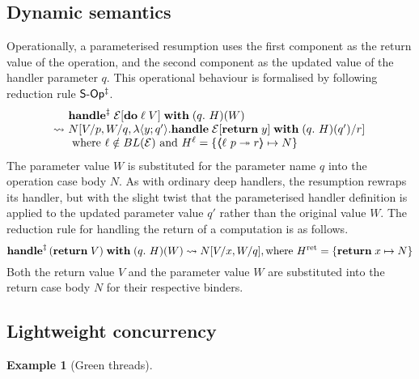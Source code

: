 \documentclass[12pt,phd,lfcs,twoside,openright,logo,leftchapter,normalheadings]{infthesis}
\theoremstyle{plain}
\theoremstyle{definition}
\newtheorem{example}{Example}[chapter]
\begin{document}
\subsection{Dynamic semantics}
Operationally, a parameterised resumption uses the first component as
the return value of the operation, and the second component as the
updated value of the handler parameter $q$.
%
This operational behaviour is formalised by following reduction rule
$\mathsf{S\textrm{-}Op^{\ddagger}}$.
%
\[
\ba{@{~}l@{~}l}
  &\ParamHandle \; \EC[\Do \; \ell \; V] \; \With \; (q.~H)(W)\\
  \reducesto&
  N[V/p,W/q,\lambda \Record{y;q'}.\Handle \; \EC[\Return \; y] \; \With \; (q.~H)(q')/r]\\
  & \text{ where } \ell \notin BL(\EC) \text{ and } \hell = \{ \OpCase{\ell}{p}{r} \mapsto N \}
\ea
\]
%
The parameter value $W$ is substituted for the parameter name $q$ into
the operation case body $N$. As with ordinary deep handlers, the
resumption rewraps its handler, but with the slight twist that the
parameterised handler definition is applied to the updated parameter
value $q'$ rather than the original value $W$. The reduction rule for
handling the return of a computation is as follows.
%
\[
  \mathbf{handle}^{\ddagger} \, (\mathbf{return} \; V) \; \mathbf{with} \; (q.~H)(W) \leadsto N[V/x,W/q], \text{where } H^{\mathrm{ret}} = \{ \mathbf{return} \; x \mapsto N \}
\]
%
Both the return value $V$ and the parameter value $W$ are substituted
into the return case body $N$ for their respective binders.

\subsection{Lightweight concurrency}

\begin{example}[Green threads]
\end{example}



\end{document}
